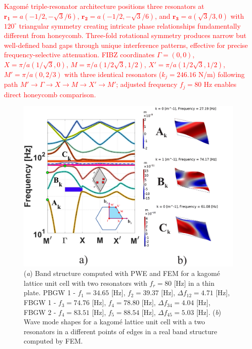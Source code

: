\documentclass[review,numbers,sort&compress]{elsarticle}
\begin{document}
\textcolor{red}{Kagomé triple-resonator architecture positions three resonators at \( \mathbf{r_1} = a(-1/2, -\sqrt{3}/6) \), \( \mathbf{r_2} = a(-1/2, -\sqrt{3}/6) \), and \( \mathbf{r_3} = a(\sqrt{3}/3, 0) \) with $120^\circ$ triangular symmetry creating intricate phase relationships fundamentally different from honeycomb. Three-fold rotational symmetry produces narrow but well-defined band gaps through unique interference patterns, effective for precise frequency-selective attenuation. FIBZ coordinates \( \Gamma = (0,0) \), \( X = \pi/a(1/\sqrt{3},0) \), \( M = \pi/a(1/2\sqrt{3},1/2) \), \( X' = \pi/a(1/2\sqrt{3},1/2) \), \( M' = \pi/a(0,2/3) \) with three identical resonators (\( k_j = 246.16 \) N/m) following path \( M' \longrightarrow \Gamma \longrightarrow X \longrightarrow M \longrightarrow X' \longrightarrow M' \); adjusted frequency \( f_j = 80 \) Hz enables direct honeycomb comparison.}

\newpage
\begin{figure}[htb]
	\centering
	\includegraphics[width=1\textwidth]{1_5_disp_frf_kag.pdf}
	\caption{(\textit{a}) Band structure computed with PWE and FEM for a kagomé lattice unit cell with two resonators with $f_r = 80$ [Hz] in a thin plate. PBGW 1 - $f_1 = 34.65$ [Hz], $f_2 = 39.37$ [Hz], $\Delta f_{12} = 4.71 $ [Hz], FBGW 1 - $f_3 = 74.76$ [Hz], $f_4 = 78.80$ [Hz], $\Delta f_{34} = 4.04 $ [Hz], FBGW 2 - $f_4 = 83.51$ [Hz], $f_5 = 88.54$ [Hz], $\Delta f_{45} = 5.03 $ [Hz]. (\textit{b}) Wave mode shapes for a kagomé lattice unit cell with a two resonators in a different points of edges in a real band structure computed by FEM.}
	\label{pwe_fem_disp_modal_kag}
\end{figure}
\end{document}
